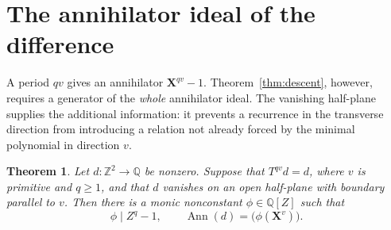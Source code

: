 \documentclass[11pt,a4paper,reqno]{amsart}
\newtheorem{theorem}{Theorem}[section]
\theoremstyle{remark}
\newcommand{\Z}{\mathbb Z}
\newcommand{\Q}{\mathbb Q}
\newcommand{\mon}[1]{\boldsymbol X^{#1}}
\DeclareMathOperator{\Ann}{Ann}
\numberwithin{equation}{section}
\begin{document}
\section{The annihilator ideal of the difference}\label{sec:ideal}
A period $qv$ gives an annihilator $\mon{qv}-1$. Theorem~\ref{thm:descent}, however, requires a generator of the \emph{whole} annihilator ideal. The vanishing half-plane supplies the additional information: it prevents a recurrence in the transverse direction from introducing a relation not already forced by the minimal polynomial in direction $v$.

\begin{theorem}\label{thm:exact-ideal}
Let $d:\Z^2\to\Q$ be nonzero. Suppose that $T^{qv}d=d$, where $v$ is primitive and $q\ge1$, and that $d$ vanishes on an open half-plane with boundary parallel to $v$. Then there is a monic nonconstant $\phi\in\Q[Z]$ such that
\begin{equation}\label{eq:exact-ideal}
 \phi\mid Z^q-1,
 \qquad \Ann(d)=\bigl(\phi(\mon v)\bigr).
\end{equation}
\end{theorem}
\end{document}
